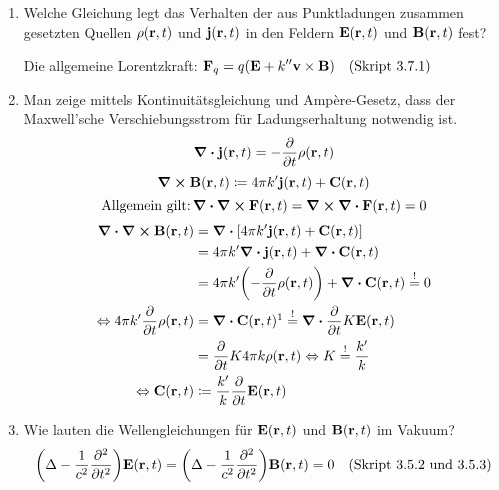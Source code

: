 \documentclass{scrartcl}
\newcommand{\ds}{\displaystyle}
\newcommand{\smref}[1]{\quad\text{(Skript #1)}}
\begin{document}
\begin{enumerate}
    \item Welche Gleichung legt das Verhalten der aus Punktladungen
          zusammen gesetzten Quellen $\rho(\vb r, t)$ und 
          $\vb j(\vb r, t)$ in den Feldern $\vb E(\vb r, t)$
          und $\vb B(\vb r, t)$ fest?
          \begin{center}
            Die allgemeine Lorentzkraft: 
            $\ds \vb F_q=q\qty(\vb E+k''\vb v\times\vb B)\smref{3.7.1}$
          \end{center}

    \item Man zeige mittels Kontinuitätsgleichung und Ampère-Gesetz, 
          dass der Maxwell'sche Verschiebungsstrom für Ladungserhaltung
          notwendig ist.
          $$\div \vb j(\vb r, t) = -\pdv{t}\rho(\vb r ,t)$$
          $$\curl\vb B(\vb r, t) \coloneqq 
          4\pi k'\vb j(\vb r ,t) + \vb C(\vb r, t)$$
          $$\text{Allgemein gilt:}\,\div\curl\vb F(\vb r, t)
          =\curl \div \vb F(\vb r, t)=0$$
          \begin{equation*}
            \begin{split}
            \ds \div\curl\vb B(\vb r, t)
                        &\ds= \div \qty[
                        4\pi k'\vb j(\vb r, t)+\vb C(\vb r, t)]\\
                        &\ds= 4\pi k'\div\vb j(\vb r,t) +
                        \div \vb C(\vb r,t)\\
                        &\ds= 4\pi k'\qty(-\pdv{t}\rho(\vb r, t)) 
                        +\div \vb C(\vb r,t)\stackrel{!}{=}0\\
            \Leftrightarrow\ds 4\pi k'\pdv{t}\rho(\vb r, t) 
                        &\ds =\div \vb 
                        C(\vb r, t)\footnotemark
                        \stackrel{!}{=}\div \pdv{t}K\vb E(\vb r, t)\\
                        &\ds =\ds \pdv{t} 
                        K4\pi k \rho(\vb r, t)
            \Leftrightarrow K         
                        \stackrel{!}{=}\frac{k'}{k}\\
            \Leftrightarrow \vb C(\vb r,t)
                        &\coloneqq \frac{k'}{k}\pdv{t}\vb E(\vb r, t)
            \end{split}
          \end{equation*}

    \item Wie lauten die Wellengleichungen für $\vb E(\vb r, t)$ und
          $\vb B(\vb r, t)$ im Vakuum?
          $$\qty(\Delta - \frac{1}{c^2}\pdv[2]{t})\vb E(\vb r, t)=
          \qty(\Delta - \frac{1}{c^2}\pdv[2]{t})\vb B(\vb r, t)=0
          \smref{3.5.2 und 3.5.3}$$


\end{enumerate}
\end{document}
